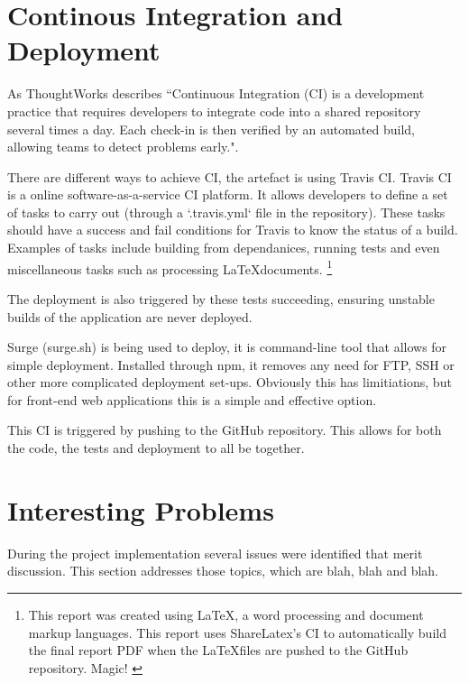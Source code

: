 
\section{Continous Integration and Deployment}

As ThoughtWorks describes ``Continuous Integration (CI) is a development practice that requires developers to integrate code into a shared repository several times a day. Each check-in is then verified by an automated build, allowing teams to detect problems early.". \cite{continuous_integration}

There are different ways to achieve CI, the artefact is using Travis CI. Travis CI is a online software-as-a-service CI platform. It allows developers to define a set of tasks to carry out (through a `.travis.yml` file in the repository). These tasks should have a success and fail conditions for Travis to know the status of a build. Examples of tasks include building from dependanices, running tests and even miscellaneous tasks such as processing \LaTeX documents. \footnote{This report was created using \LaTeX, a word processing and document markup languages. \cite{latex} This report uses ShareLatex's CI to automatically build the final report PDF when the \LaTeX files are pushed to the GitHub repository. Magic! \cite{sharelatex}}

The deployment is also triggered by these tests succeeding, ensuring unstable builds of the application are never deployed.

Surge (surge.sh) is being used to deploy, it is command-line tool that allows for simple deployment. Installed through npm, it removes any need for FTP, SSH or other more complicated deployment set-ups. Obviously this has limitiations, but for front-end web applications this is a simple and effective option. \cite{surge}

This CI is triggered by pushing to the GitHub repository. This allows for both the code, the tests and deployment to all be together.

\section{Interesting Problems} \label{s-i--interesting-problems}


During the project implementation several issues were identified that merit discussion. This section addresses those topics, which are blah, blah and blah.


